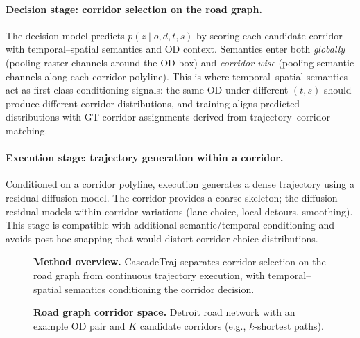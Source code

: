 \paragraph{Decision stage: corridor selection on the road graph.}
The decision model predicts $p(z\mid o,d,t,s)$ by scoring each candidate corridor with temporal--spatial semantics and OD context.
Semantics enter both \emph{globally} (pooling raster channels around the OD box) and \emph{corridor-wise} (pooling semantic channels along each corridor polyline).
This is where temporal--spatial semantics act as first-class conditioning signals: the same OD under different $(t,s)$ should produce different corridor distributions, and training aligns predicted distributions with GT corridor assignments derived from trajectory--corridor matching.

\paragraph{Execution stage: trajectory generation within a corridor.}
Conditioned on a corridor polyline, execution generates a dense trajectory using a residual diffusion model.
The corridor provides a coarse skeleton; the diffusion residual models within-corridor variations (lane choice, local detours, smoothing).
This stage is compatible with additional semantic/temporal conditioning and avoids post-hoc snapping that would distort corridor choice distributions.

\begin{figure}[t]
  \centering
  \caption{\textbf{Method overview.} CascadeTraj separates corridor selection on the road graph from continuous trajectory execution, with temporal--spatial semantics conditioning the corridor decision.}
  \label{fig:method-comparison}
\end{figure}

\begin{figure}[t]
  \centering
  \caption{\textbf{Road graph corridor space.} Detroit road network with an example OD pair and $K$ candidate corridors (e.g., $k$-shortest paths).}
  \label{fig:road-graph}
\end{figure}
